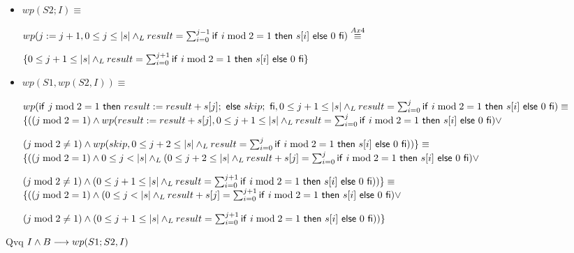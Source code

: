 \documentclass{article}
\begin{document}
\begin{itemize}
    \item $wp(S2; I) \equiv$

    $wp(j:= j+1, 0 \leq j \leq |s| \land _L result = \sum_{i=0}^{j-1} \mathsf{if}\ i \bmod 2 = 1\ \mathsf{then}\ s[i]\ \mathsf{else}\ 0\ \mathsf{fi}) \stackrel{Ax4}{\equiv}$

    $\{0 \leq j+1 \leq |s| \land _L result = \sum_{i=0}^{j+1} \mathsf{if}\ i \bmod 2 = 1\ \mathsf{then}\ s[i]\ \mathsf{else}\ 0\ \mathsf{fi} \}$

    \item $wp(S1, wp(S2, I)) \equiv$

    $wp(\mathsf{if}\ j \bmod 2 = 1\ \mathsf{then}\ result:= result + s[j];\ \mathsf{else}\ skip;\ \mathsf{fi},0 \leq j+1 \leq |s| \land _L result = \sum_{i=0}^{j} \mathsf{if}\ i \bmod 2 = 1\ \mathsf{then}\ s[i]\ \mathsf{else}\ 0\ \mathsf{fi})\equiv$\\

    $\{ ((j \bmod 2 = 1) \wedge wp(result:=result + s[j], 0 \leq j+1 \leq |s| \land _L result = \sum_{i=0}^{j} \mathsf{if}\ i \bmod 2 = 1\ \mathsf{then}\ s[i]\ \mathsf{else}\ 0\ \mathsf{fi}) \vee $

    $ (j \bmod 2 \neq 1) \wedge wp(skip, 0 \leq j+2 \leq |s| \land _L result = \sum_{i=0}^{j} \mathsf{if}\ i \bmod 2 = 1\ \mathsf{then}\ s[i]\ \mathsf{else}\ 0\ \mathsf{fi}))\} \equiv$\\

    $\{ ((j \bmod 2 = 1) \wedge 0 \leq j < |s| \land _L (0 \leq j+2 \leq |s| \land _L result + s[j] = \sum_{i=0}^{j} \mathsf{if}\ i \bmod 2 = 1\ \mathsf{then}\ s[i]\ \mathsf{else}\ 0\ \mathsf{fi}) \vee $

    $ (j \bmod 2 \neq 1) \wedge (0 \leq j+1 \leq |s| \land _L result = \sum_{i=0}^{j+1} \mathsf{if}\ i \bmod 2 = 1\ \mathsf{then}\ s[i]\ \mathsf{else}\ 0\ \mathsf{fi}))\} \equiv$\\

    $\{ ((j \bmod 2 = 1) \wedge (0 \leq j < |s| \land _L result + s[j] = \sum_{i=0}^{j+1} \mathsf{if}\ i \bmod 2 = 1\ \mathsf{then}\ s[i]\ \mathsf{else}\ 0\ \mathsf{fi}) \vee $

    $ (j \bmod 2 \neq 1) \wedge (0 \leq j+1 \leq |s| \land _L result = \sum_{i=0}^{j+1} \mathsf{if}\ i \bmod 2 = 1\ \mathsf{then}\ s[i]\ \mathsf{else}\ 0\ \mathsf{fi}))\}$

\end{itemize}

Qvq $I \wedge B \longrightarrow wp(S1;S2, I)$
\end{document}
